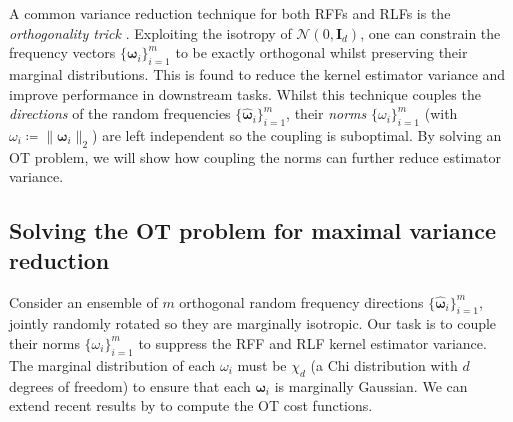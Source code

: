 A common variance reduction technique for both RFFs and RLFs is the \emph{orthogonality trick} \citep{yu2016orthogonal, rowland2018geometrically,simrfs,choromanski2018geometry}.
Exploiting the isotropy of $\mathcal{N}(0,\mathbf{I}_d)$, one can constrain the frequency vectors $\{ \boldsymbol{\omega}_i\}_{i=1}^m$ to be exactly orthogonal whilst preserving their marginal distributions.
This is found to reduce the kernel estimator variance and improve performance in downstream tasks.
Whilst this technique couples the \emph{directions} of the random frequencies $\{\widehat{\boldsymbol{\omega}}_i\}_{i=1}^m$, their \emph{norms} $\{\omega_i\}_{i=1}^m$ (with $\omega_i \coloneqq \|\boldsymbol{\omega}_i\|_2$) are left independent so the coupling is suboptimal. 
By solving an OT problem, we will show how coupling the norms can further reduce estimator variance.

\subsection{Solving the OT problem for maximal variance reduction} \label{sec:rffs_rlfs_theory}
Consider an ensemble of $m$ orthogonal random frequency directions $\{\widehat{\boldsymbol{\omega}}_i\}_{i=1}^m$, jointly randomly rotated so they are marginally isotropic. 
Our task is to couple their norms $\{\omega_i\}_{i=1}^m$ to suppress the RFF and RLF kernel estimator variance.
The marginal distribution of each $\omega_i$ must be $\chi_d$ (a Chi distribution with $d$ degrees of freedom) to ensure that each $\boldsymbol{\omega}_i$ is marginally Gaussian.
We can extend recent results by \citet{simrfs} to compute the OT cost functions. 


